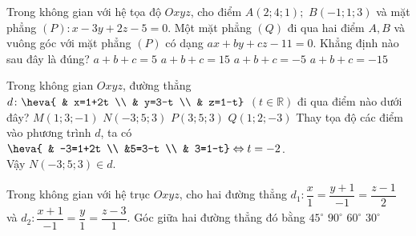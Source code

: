 \begin{ex}%
Trong không gian với hệ tọa độ $O x y z$, cho điểm $A(2 ; 4 ; 1) ;$ $ B(-1 ; 1 ; 3)$ và mặt phẳng $(P)\colon x-3 y+2 z-5=0$. Một mặt phẳng $(Q)$ đi qua hai điểm $A, B$ và vuông góc với mặt phẳng $(P)$ có dạng $a x+b y+c z-11=0$. Khẳng định nào sau đây là đúng?
\choice
{\True $a+b+c=5$}
{$a+b+c=15$}
{$a+b+c=-5$}
{$a+b+c=-15$}
\end{ex}

\begin{ex}%
Trong không gian $Oxyz$, đường thẳng $d\colon \heva{ & x=1+2t \\ & y=3-t \\ & z=1-t}$ $(t\in \mathbb{R})$ đi qua điểm nào dưới đây?
\choice
{$M(1;3;-1)$}
{\True $N(-3;5;3)$}
{$P(3;5;3)$}
{$Q(1;2;-3)$}
\loigiai
{
Thay tọa độ các điểm vào phương trình $d$, ta có $\heva{ & -3=1+2t \\ &5=3-t \\ & 3=1-t} \Leftrightarrow t=-2$. \\
Vậy $N(-3;5;3)\in d$.
}
\end{ex}

\begin{ex}%
Trong không gian với hệ trục $Oxyz$, cho hai đường thẳng $d_1:\dfrac{x}{1}=\dfrac{y+1}{-1}=\dfrac{z-1}{2}$ và $d_2:\dfrac{x+1}{-1}=\dfrac{y}{1}=\dfrac{z-3}{1}$. Góc giữa hai đường thẳng đó bằng
\choice
{$45^\circ $}
{\True $90^\circ $}
{$60^\circ $}
{$30^\circ $}
\end{ex}

